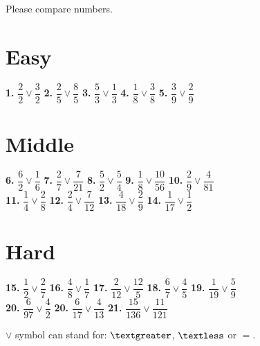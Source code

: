 \documentclass[a4paper, 12pt]{article}
\begin{document}
	{\large Please compare numbers.}	
	
	\section* {{\Large Easy}}
	
	{\Large \textbf{1.} $\dfrac{2}{2}\vee\dfrac{3}{2}$ \hspace{0.5cm}
		   \textbf{2.} $\dfrac{2}{5}\vee\dfrac{8}{5}$ \hspace{0.5cm}
		   \textbf{3.} $\dfrac{5}{3}\vee\dfrac{1}{3}$ \hspace{0.5cm}
		   \textbf{4.} $\dfrac{1}{8}\vee\dfrac{3}{8}$ \hspace{0.5cm}
           \textbf{5.} $\dfrac{3}{9}\vee\dfrac{2}{9}$
	
	\section* {{\Large Middle}}
	
	{\Large \textbf{6.} $\dfrac{6}{2}\vee\dfrac{1}{6}$ \hspace{0.5cm}
		   \textbf{7.} $\dfrac{2}{7}\vee\dfrac{7}{21}$ \hspace{0.5cm}
		   \textbf{8.} $\dfrac{5}{2}\vee\dfrac{5}{4}$ \hspace{0.5cm}
		   \textbf{9.} $\dfrac{1}{8}\vee\dfrac{10}{56}$ \hspace{0.5cm}
		   \textbf{10.} $\dfrac{2}{9}\vee\dfrac{4}{81}$ \\ [0.5cm]
		   \textbf{11.} $\dfrac{1}{4}\vee\dfrac{2}{8}$ \hspace{0.5cm}
		   \textbf{12.} $\dfrac{2}{4}\vee\dfrac{7}{12}$ \hspace{0.5cm}
		   \textbf{13.} $\dfrac{4}{18}\vee\dfrac{2}{9}$ \hspace{0.5cm}
		   \textbf{14.} $\dfrac{1}{17}\vee\dfrac{1}{2}$ \hspace{0.5cm}}
	
	\section* {{\Large Hard}}

		   \textbf{15.} $\dfrac{1}{2}\vee\dfrac{2}{7}$ \hspace{0.5cm}
		   \textbf{16.} $\dfrac{4}{8}\vee\dfrac{1}{7}$ \hspace{0.5cm}
		   \textbf{17.} $\dfrac{2}{12}\vee\dfrac{12}{5}$ \hspace{0.5cm}
		   \textbf{18.} $\dfrac{6}{7}\vee\dfrac{4}{5}$  \hspace{0.5cm}
		   \textbf{19.} $\dfrac{1}{19}\vee\dfrac{5}{9}$ \\ [0.5cm]
		   \textbf{20.} $\dfrac{6}{97}\vee\dfrac{4}{2}$  \hspace{0.5cm}
		   \textbf{20.} $\dfrac{6}{17}\vee\dfrac{4}{13}$  \hspace{0.5cm}
		   \textbf{21.} $\dfrac{15}{136}\vee\dfrac{11}{121}$  \\ [0.5cm]}
	   
	 {\large $\vee$ symbol can stand for: $\textgreater$, $\textless$ or $=$.}
		
\end{document}
